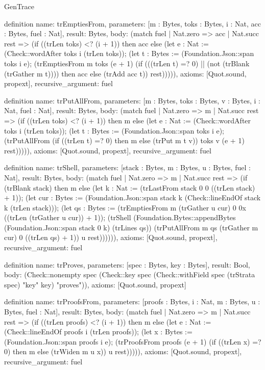 \begin{lexlean}{GenTrace}
\begin{semanticmodule}
definition{
  name: trEmptiesFrom,
  parameters: [m : Bytes, toks : Bytes, i : Nat, acc : Bytes, fuel : Nat],
  result: Bytes,
  body: (match fuel
    | Nat.zero => acc
    | Nat.succ rest => (if ((trLen toks) <? (i + 1)) then acc else (let e : Nat := (Check::wordAfter toks i (trLen toks)); (let t : Bytes := (Foundation.Json::span toks i e); (trEmptiesFrom m toks (e + 1) (if (((trLen t) =? 0) || (not (trBlank (trGather m t)))) then acc else (trAdd acc t)) rest))))),
  axioms: [Quot.sound, propext],
  recursive_argument: fuel
}

definition{
  name: trPutAllFrom,
  parameters: [m : Bytes, toks : Bytes, v : Bytes, i : Nat, fuel : Nat],
  result: Bytes,
  body: (match fuel
    | Nat.zero => m
    | Nat.succ rest => (if ((trLen toks) <? (i + 1)) then m else (let e : Nat := (Check::wordAfter toks i (trLen toks)); (let t : Bytes := (Foundation.Json::span toks i e); (trPutAllFrom (if ((trLen t) =? 0) then m else (trPut m t v)) toks v (e + 1) rest))))),
  axioms: [Quot.sound, propext],
  recursive_argument: fuel
}

definition{
  name: trShell,
  parameters: [stack : Bytes, m : Bytes, u : Bytes, fuel : Nat],
  result: Bytes,
  body: (match fuel
    | Nat.zero => m
    | Nat.succ rest => (if (trBlank stack) then m else (let k : Nat := (trLastFrom stack 0 0 ((trLen stack) + 1)); (let cur : Bytes := (Foundation.Json::span stack k (Check::lineEndOf stack k (trLen stack))); (let qs : Bytes := (trEmptiesFrom m (trGather u cur) 0 0x ((trLen (trGather u cur)) + 1)); (trShell (Foundation.Bytes::appendBytes (Foundation.Json::span stack 0 k) (trLines qs)) (trPutAllFrom m qs (trGather m cur) 0 ((trLen qs) + 1)) u rest)))))),
  axioms: [Quot.sound, propext],
  recursive_argument: fuel
}

definition{
  name: trProves,
  parameters: [spec : Bytes, key : Bytes],
  result: Bool,
  body: (Check::nonempty spec (Check::key spec (Check::withField spec (trStrata spec) "key" key) "proves")),
  axioms: [Quot.sound, propext]
}

definition{
  name: trProofsFrom,
  parameters: [proofs : Bytes, i : Nat, m : Bytes, u : Bytes, fuel : Nat],
  result: Bytes,
  body: (match fuel
    | Nat.zero => m
    | Nat.succ rest => (if ((trLen proofs) <? (i + 1)) then m else (let e : Nat := (Check::lineEndOf proofs i (trLen proofs)); (let x : Bytes := (Foundation.Json::span proofs i e); (trProofsFrom proofs (e + 1) (if ((trLen x) =? 0) then m else (trWiden m u x)) u rest))))),
  axioms: [Quot.sound, propext],
  recursive_argument: fuel
}


\end{semanticmodule}
\end{lexlean}
